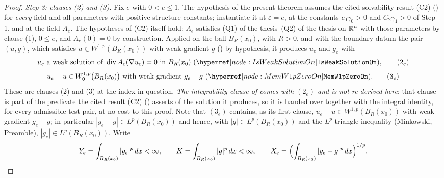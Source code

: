 \begin{proof}
\emph{Step 3: clauses (2) and (3).}  Fix $e$ with $0<e\le1$.  The hypothesis of
the present theorem assumes the cited solvability result (C2)
() for \emph{every} field and all parameters with
positive structure constants; instantiate it at $\varepsilon=e$, at the
constants $c_0\gamma_0>0$ and $C_2\gamma_1>0$ of Step 1, and at the field $A_e$.
The hypotheses of (C2) itself hold: $A_e$ satisfies
(Q1) of the thesis--(Q2) of the thesis on $\mathbb{R}^n$ with those parameters by clause (1),
$0\le e$, and $A_e(0)=0$ by construction.  Applied on the ball $B_R(x_0)$, with
$R>0$, and with the boundary datum the pair $(u,g)$, which satisfies
$u\in W^{1,p}(B_R(x_0))$ with weak gradient $g$ () by
hypothesis, it produces $u_e$ and $g_e$ with
\[
u_e\ \text{a weak solution of }\operatorname{div}A_e(\nabla u_e)=0\ \text{in }B_R(x_0)
\ (\noderef{IsWeakSolutionOn}),
\tag{2$_e$}
\]
\[
u_e-u\in W^{1,p}_0\bigl(B_R(x_0)\bigr)\ \text{with weak gradient }g_e-g
\ (\noderef{MemW1pZeroOn}).
\tag{3$_e$}
\]
These are clauses (2) and (3) at the index in question.  \emph{The
integrability clause of  comes with
$(2_e)$ and is not re-derived here}: that clause is part of the predicate the
cited result (C2) () asserts of the solution it
produces, so it is handed over together with the integral identity, for every
admissible test pair, at no cost to this proof.  Note that
$(3_e)$ contains, as its first clause, $u_e-u\in W^{1,p}(B_R(x_0))$ with weak
gradient $g_e-g$; in particular $|g_e-g|\in L^p(B_R(x_0))$ and hence, with
$|g|\in L^p(B_R(x_0))$ and the $L^p$ triangle inequality (Minkowski, Preamble),
$|g_e|\in L^p(B_R(x_0))$.  Write
\[
Y_e=\int_{B_R(x_0)}|g_e|^p\,dx<\infty,
\qquad
K=\int_{B_R(x_0)}|g|^p\,dx<\infty,
\qquad
X_e=\Bigl(\int_{B_R(x_0)}|g_e-g|^p\,dx\Bigr)^{1/p}.
\]


\end{proof}
